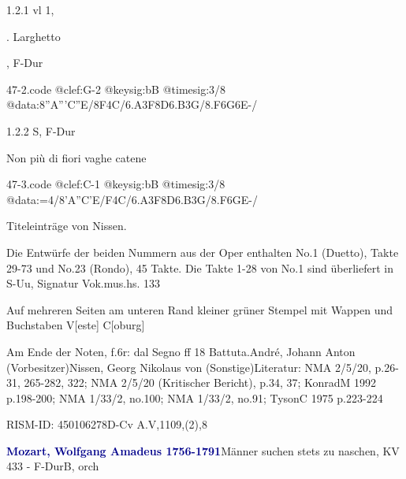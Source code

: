\documentclass[a4paper, twocolumn, 11pt]{book}
\begin{document}
\par 1.2.1  vl 1, \begin{itshape}[No 23 Rondo]. Larghetto\end{itshape}, F-Dur  
\begin{filecontents*}{47-2.code}
@clef:G-2
@keysig:bB
@timesig:3/8
@data:8''{A'''C''E}/8F4C/{6.A3F8D}{6.B3G}/{8.F6G}6E-/
\end{filecontents*}
\newline %
\par 1.2.2  S, F-Dur\newline \begin{footnotesize} Non più di fiori vaghe catene \end{footnotesize}  
\begin{filecontents*}{47-3.code}
@clef:C-1
@keysig:bB
@timesig:3/8
@data:=4/8'A''C'E/F4C/{6.A3F}8D{6.B3G}/{8.F6G}E-/
\end{filecontents*}
\newline %
\par Titeleinträge von Nissen.
\par Die Entwürfe der beiden Nummern aus der Oper enthalten No.1 (Duetto), Takte 29-73 und No.23 (Rondo), 45 Takte. Die Takte 1-28 von No.1 sind überliefert in S-Uu, Signatur Vok.mus.hs. 133
\par Auf mehreren Seiten am unteren Rand kleiner grüner Stempel mit Wappen und Buchstaben V[este] C[oburg]
\par Am Ende der Noten, f.6r: {\textquotedbl}dal Segno ff 18 Battuta.{\textquotedbl}\newline André, Johann Anton  (Vorbesitzer)\newline Nissen, Georg Nikolaus von  (Sonstige)\newline Literatur: NMA  2/5/20, p.26-31, 265-282, 322; NMA  2/5/20 (Kritischer Bericht), p.34, 37; KonradM 1992  p.198-200; NMA  1/33/2, no.100; NMA  1/33/2, no.91; TysonC 1975  p.223-224
\par RISM-ID: 450106278\newline D-Cv  A.V,1109,(2),8
\par \vspace{16pt} \textcolor{darkblue}{\textbf{Mozart, Wolfgang Amadeus  1756-1791}}\hfillplus{[48]}\newline Männer suchen stets zu naschen, KV 433 - F-Dur\newline B, orch
\end{document}
